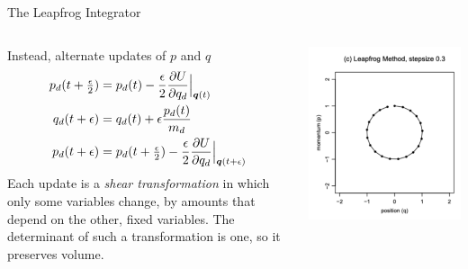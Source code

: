 \documentclass[aspectratio=169]{beamer}
\begin{document}
\begin{frame}{The Leapfrog Integrator}

\begin{columns}
\begin{column}{.66\textwidth}
Instead, alternate updates of $p$ and $q$
\begin{align}
    p_d(t+\tfrac{\epsilon}{2}) &= p_d(t) - \frac{\epsilon}{2} \frac{\partial U}{\partial q_d} \Big|_{\boldsymbol{q}(t)} \\
    q_d(t+\epsilon) &= q_d(t) + \epsilon \frac{p_d(t)}{m_d} \\
    p_d(t+\epsilon) &= p_d(t + \tfrac{\epsilon}{2}) - \frac{\epsilon}{2} \frac{\partial U}{\partial q_d} \Big|_{\boldsymbol{q}(t + \epsilon)} \\
\end{align}
Each update is a \textit{shear transformation} in which only some variables change, by amounts that depend on the other, fixed variables. The determinant of such a transformation is one, so it preserves volume.
\end{column}

\begin{column}{.33\textwidth}
\centering
\includegraphics[width=\textwidth]{figures/lap3/leapfrog.pdf}
\end{column}
\end{columns}
    
\end{frame}
\end{document}
